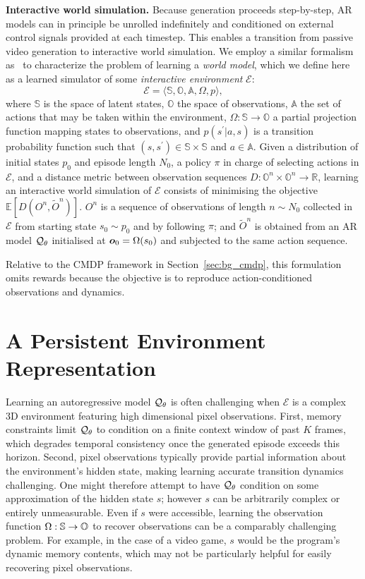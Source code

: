 \textbf{Interactive world simulation.} Because generation proceeds step-by-step, AR models can in principle be unrolled indefinitely and conditioned on external control signals provided at each timestep.
This enables a transition from passive video generation to interactive world simulation. We employ a similar formalism as~\citet{valevski2024diffusionmodelsrealtimegame} to characterize the problem of learning a \textit{world model}, which we define here as a learned simulator of some \textit{interactive environment} $\mathcal{E}$:
\begin{equation}
    \mathcal{E} = \langle \mathbb{S} , \mathbb{O}, \mathbb{A}, \Omega, p\rangle,
\end{equation}
 where $\mathbb{S}$ is the space of latent states, $\mathbb{O}$ the space of observations, $\mathbb{A}$ the set of actions that may be taken within the environment, $\Omega : \mathbb{S} \rightarrow \mathbb{O}$ a partial projection function mapping states to observations, and $p(s^\prime|a,s)$ is a transition probability function such that $(s,s^\prime) \in \mathbb{S}\times\mathbb{S}$ and $a \in \mathbb{A}$.
Given a distribution of initial states $p_0$ and episode length $N_0$, a policy $\pi$ in charge of selecting actions in $\mathcal{E}$, and a distance metric between observation sequences $D : \mathbb{O}^n \times \mathbb{O}^n \rightarrow \mathbb{R}$, learning an interactive world simulation of $\mathcal{E}$ consists of minimising the objective $\mathbb{E}[D(O^n, \tilde{O}^n)]$. $O^n$ is a sequence of observations of length $n\sim N_0$ collected in $\mathcal{E}$ from starting state $s_0\sim p_0$ and by following $\pi$; and $\tilde{O}^n$ is obtained from an AR model ${\mathcal{Q}}_\theta$ initialised at ${\bm{o}}_0 = \Omega(s_0)$ and subjected to the same action sequence.

Relative to the CMDP framework in Section~\ref{sec:bg_cmdp}, this formulation omits rewards because the objective is to reproduce action-conditioned observations and dynamics.

\vspace{-0.2cm}
\section{A Persistent Environment Representation}
Learning an autoregressive model ${\mathcal{Q}}_\theta$ is often challenging when $\mathcal{E}$ is a complex 3D environment featuring high dimensional pixel observations.
First, memory constraints limit ${\mathcal{Q}}_\theta$ to condition on a finite context window of past $K$ frames, which degrades temporal consistency once the generated episode exceeds this horizon. 
Second, pixel observations typically provide partial information about the environment's hidden state, making learning accurate transition dynamics challenging.
One might therefore attempt to have ${\mathcal{Q}}_\theta$ condition on some approximation of the hidden state $s$; however $s$ can be arbitrarily complex or entirely unmeasurable. Even if $s$ were accessible, learning the observation function $\Omega : {\mathbb{S}} \rightarrow {\mathbb{O}} $ to recover observations can be a comparably challenging problem. For example, in the case of a video game, $s$ would be the program's dynamic memory contents, which may not be particularly helpful for easily recovering pixel observations. 

